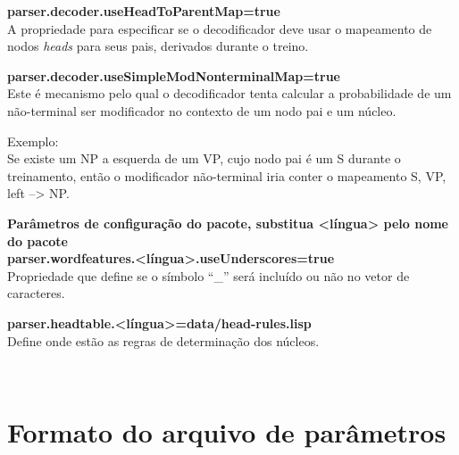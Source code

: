 \textbf{parser.decoder.useHeadToParentMap=true}\\
A propriedade para especificar se o decodificador deve usar o mapeamento de nodos \emph{heads} para seus pais, derivados durante o treino.

\textbf{parser.decoder.useSimpleModNonterminalMap=true}\\
Este é mecanismo pelo qual o decodificador tenta calcular a probabilidade de um não-terminal ser modificador no contexto de um nodo pai e um núcleo.

Exemplo:\\
Se existe um NP a esquerda de um VP, cujo nodo pai é um S durante o treinamento, então o modificador não-terminal iria conter o mapeamento S, VP, left --> NP.

\textbf{Parâmetros de configuração do pacote, substitua <língua> pelo nome do pacote}\\
\textbf{parser.wordfeatures.<língua>.useUnderscores=true}\\
Propriedade que define se o símbolo ``\_'' será incluído ou não no vetor de caracteres.

\textbf{parser.headtable.<língua>=data/head-rules.lisp}\\
Define onde estão as regras de determinação dos núcleos.

\HRule \\





\section{Formato do arquivo de parâmetros}
\label{sec:bikel_formato_aqrquivo}


